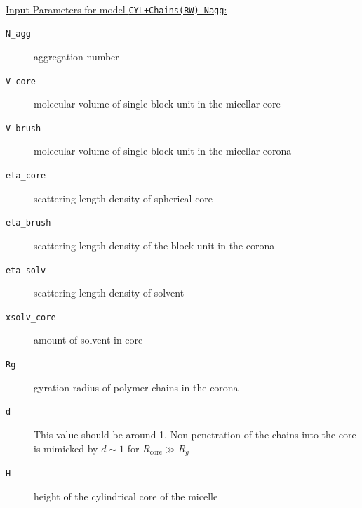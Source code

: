 \hspace{1pt}\\
\uline{Input Parameters for model \texttt{CYL+Chains(RW)\_Nagg}:}
\begin{description}
\item[\texttt{N\_agg}] aggregation number
\item[\texttt{V\_core}] molecular volume of single block unit in the micellar core
\item[\texttt{V\_brush}]  molecular volume of single block unit in the micellar corona
\item[\texttt{eta\_core}] scattering length density of spherical core
\item[\texttt{eta\_brush}] scattering length density of the block unit in the corona
\item[\texttt{eta\_solv}] scattering length density of solvent
\item[\texttt{xsolv\_core}] amount of solvent in core
\item[\texttt{Rg}] gyration radius of polymer chains in the corona
\item[\texttt{d}] This value should be around 1. Non-penetration of the chains
into the core is mimicked by $d\sim 1$ for $R_\text{core}\gg R_g$
\item[\texttt{H}] height of the cylindrical core of the micelle
\end{description}


\clearpage
\noindent
